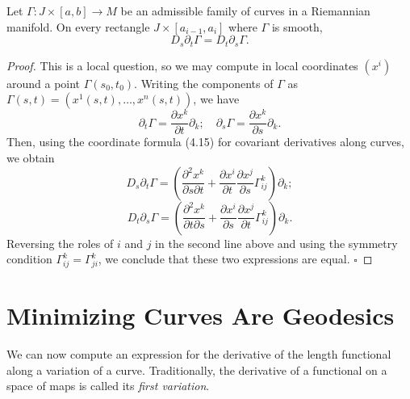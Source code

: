 
\begin{lemma}
\label{lem:symmetry-lemma}

Let $\Gamma: J \times [a,b] \to M$ be an admissible family of curves in a Riemannian manifold. On every rectangle $J \times [a_{i-1}, a_i]$ where $\Gamma$ is smooth,
\[
D_s \partial_t \Gamma = D_t \partial_s \Gamma.
\]
\end{lemma}

\begin{proof}
This is a local question, so we may compute in local coordinates $(x^i)$ around a point $\Gamma(s_0, t_0)$. Writing the components of $\Gamma$ as $\Gamma(s,t) = (x^1(s,t), \ldots, x^n(s,t))$, we have
\[
\partial_t \Gamma = \frac{\partial x^k}{\partial t} \partial_k; \quad \partial_s \Gamma = \frac{\partial x^k}{\partial s} \partial_k.
\]
Then, using the coordinate formula (4.15) for covariant derivatives along curves, we obtain
\[
D_s \partial_t \Gamma = \left( \frac{\partial^2 x^k}{\partial s \partial t} + \frac{\partial x^i}{\partial t} \frac{\partial x^j}{\partial s} \Gamma^k_{ij} \right) \partial_k;
\]
\[
D_t \partial_s \Gamma = \left( \frac{\partial^2 x^k}{\partial t \partial s} + \frac{\partial x^i}{\partial s} \frac{\partial x^j}{\partial t} \Gamma^k_{ij} \right) \partial_k.
\]
Reversing the roles of $i$ and $j$ in the second line above and using the symmetry condition $\Gamma^k_{ij} = \Gamma^k_{ji}$, we conclude that these two expressions are equal. $\square$
\end{proof}

\section{Minimizing Curves Are Geodesics}

We can now compute an expression for the derivative of the length functional along a variation of a curve. Traditionally, the derivative of a functional on a space of maps is called its \textit{first variation}.

